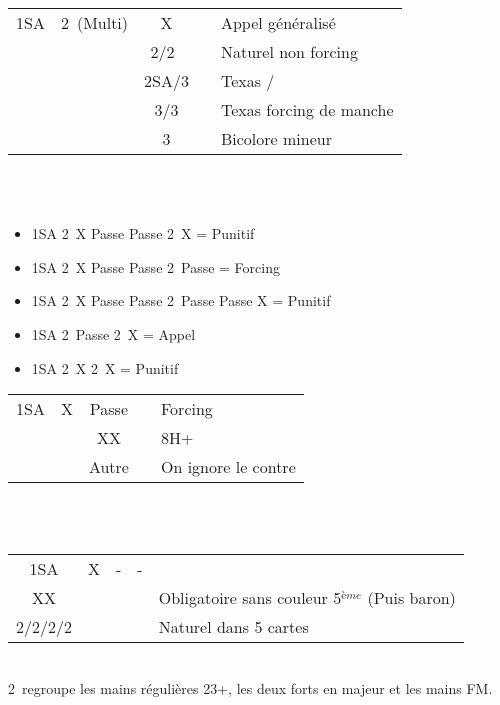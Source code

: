 \documentclass[a4paper, oneside, 11pt]{report}
\begin{document}
		\begin{tabular}{cccc|l}
		1SA & 2\carreau\ (Multi) & X && Appel généralisé\\
		&& 2\coeur/2\pique\ && Naturel non forcing\\
		&& 2SA/3\trefle && Texas \trefle/\carreau\\
		&& 3\carreau/3\coeur && Texas forcing de manche\\
		&& 3\pique && Bicolore mineur\\
		\end{tabular}\\\\

		\begin{itemize}
		\item 1SA 2\carreau\ X Passe Passe 2\coeur\ X  = Punitif
		\item 1SA 2\carreau\ X Passe Passe 2\coeur\ Passe  = Forcing
		\item 1SA 2\carreau\ X Passe Passe 2\coeur\ Passe  Passe X = Punitif
		\item 1SA 2\carreau\ Passe 2\coeur\ X = Appel
		\item 1SA 2\carreau\ X 2\coeur\ X = Punitif\\
		\end{itemize}

		\begin{tabular}{cccc|l}
		1SA & X & Passe && Forcing\\
		&& XX && 8H+\\
                  && Autre && On ignore le contre\\
		\end{tabular}\\\\

		\begin{tabular}{cccc|l}
		1SA & X & - & - & \\
                  XX &&&& Obligatoire sans couleur 5$^{ème}$ (Puis baron)\\
		2\trefle/2\carreau/2\coeur/2\pique &&&& Naturel dans 5 cartes\\
		\end{tabular}\\

	2\trefle\ regroupe les mains régulières 23+, les deux forts en majeur et les mains FM.\\
	
\end{document}
